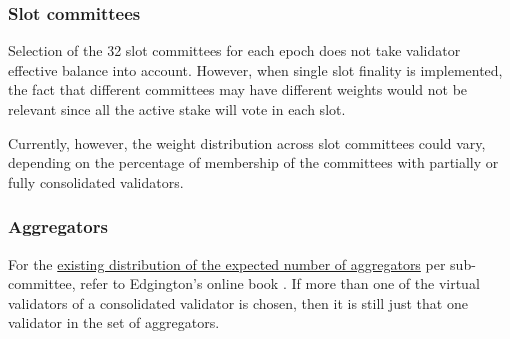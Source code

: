 \subsubsection*{Slot committees}
Selection of the 32 slot committees for each epoch does not take validator effective balance into account. However, when single slot finality is implemented, the fact that different committees may have different weights would not be relevant since all the active stake will vote in each slot.

Currently, however, the weight distribution across slot committees could vary, depending on the percentage of membership of the committees with partially or fully consolidated validators.
\subsubsection*{Aggregators}
For the \href{https://eth2book.info/capella/part2/building_blocks/aggregator/}{existing distribution of the expected number of aggregators} per sub-committee, refer to Edgington's online book \cite{Edgington2023}.
If more than one of the virtual validators of a consolidated validator is chosen, then it is still just that one validator in the set of aggregators. 
